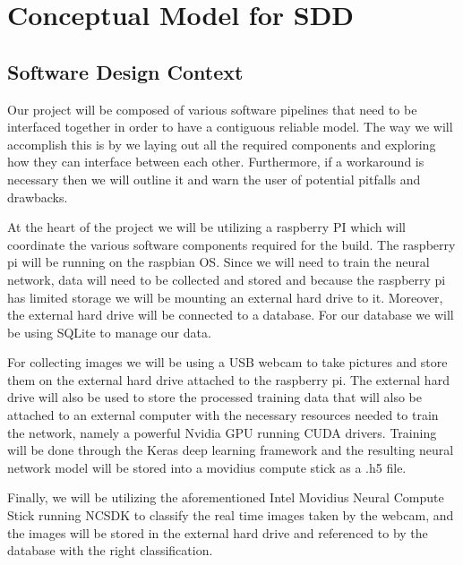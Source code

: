 \section{Conceptual Model for SDD}

\subsection{Software Design Context}
Our project will be composed of various software pipelines that need to be interfaced together in order to have a contiguous reliable model. The way we will accomplish this is by we laying  out all the required components and exploring how they can interface between each other. Furthermore, if a workaround is necessary then we will outline it and warn the user of potential pitfalls and drawbacks.

At the heart of the project we will be utilizing a raspberry PI which will coordinate the various software components required for the build. The raspberry pi will be running on the raspbian OS. Since we will need to train the neural network, data will need to be collected and stored and because the raspberry pi has limited storage we will be mounting an external hard drive to it. Moreover, the external hard drive will be connected to a database. For our database we will be using SQLite to manage our data. 

For collecting images we will be using a USB webcam to take pictures and store them on the external hard drive attached to the raspberry pi. The external hard drive will also be used to store the processed training data that will also be attached to an external computer with the necessary resources needed to train the network, namely a powerful Nvidia GPU running CUDA drivers. Training will be done through the Keras deep learning framework and the resulting neural network model will be stored into a movidius compute stick as a .h5 file. 

Finally, we will be utilizing the aforementioned Intel Movidius Neural Compute Stick running NCSDK to classify the real time images taken by the webcam, and the images will be stored in the external hard drive and referenced to by the database with the right classification.

